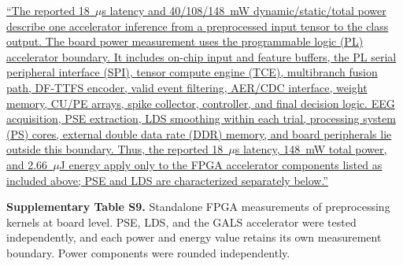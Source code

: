 \documentclass[12pt,technote,onecolumn]{IEEEtran}
\newcommand{\ResponseTableFormat}{%
  \footnotesize
  \renewcommand{\arraystretch}{1.2}%
  \setlength{\tabcolsep}{4pt}%
}
\begin{document}
\uline{``The reported 18~$\mu$s latency and 40/108/148~mW dynamic/static/total power describe one accelerator inference from a preprocessed input tensor to the class output. The board power measurement uses the programmable logic (PL) accelerator boundary. It includes on-chip input and feature buffers, the PL serial peripheral interface (SPI), tensor compute engine (TCE), multibranch fusion path, DF-TTFS encoder, valid event filtering, AER/CDC interface, weight memory, CU/PE arrays, spike collector, controller, and final decision logic. EEG acquisition, PSE extraction, LDS smoothing within each trial, processing system (PS) cores, external double data rate (DDR) memory, and board peripherals lie outside this boundary. Thus, the reported 18~$\mu$s latency, 148~mW total power, and 2.66~$\mu$J energy apply only to the FPGA accelerator components listed as included above; PSE and LDS are characterized separately below.''}

\newcommand{\EvidenceSuppTableSNine}{%
\noindent\begin{minipage}{\linewidth}
\smallskip\noindent\textbf{Supplementary Table S9.} Standalone FPGA measurements of preprocessing kernels at board level. PSE, LDS, and the GALS accelerator were tested independently, and each power and energy value retains its own measurement boundary. Power components were rounded independently.
\begin{center}
\ResponseTableFormat
{}
\end{center}
\end{minipage}\par\medskip
}
\EvidenceSuppTableSNine
\vspace{4mm}
\end{document}

